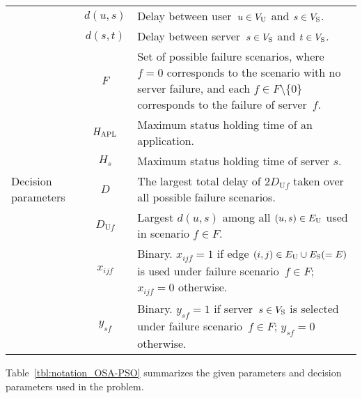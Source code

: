 \documentclass[conference]{IEEEtran}
\begin{document}
\begin{CJK}{UTF8}{ipxm}
\begin{table}[tb]
\begin{tabular}{p{1.3cm}|cp{5.4cm}}
        & $d(u,s)$ & Delay between user~$u \in V_{\rm{U}}$ and $s \in V_{\rm{S}}$. \\
        & $d(s,t)$ & Delay between server~$s \in V_{\rm{S}}$ and $t \in V_{\rm{S}}$. \\ 
        & $F$ & Set of possible failure scenarios, where $f = 0$ corresponds to the scenario with no server failure, and each $f \in F \setminus \{0\}$ corresponds to the failure of server~$f$. \\
        & $H_{\rm APL}$ & Maximum status holding time of an application. \\
        & $H_s$ & Maximum status holding time of server $s$. \\ \hline
        Decision parameters & $D$ & The largest total delay of $2D_{\mathrm{U}f}$ taken over all possible failure scenarios. \\
        & $D_{\mathrm{U}f}$ & Largest $d(u,s)$ among all $(u,s) \in E_{\rm{U}}$ used in scenario $f \in F$. \\
        & $x_{ijf}$ & Binary. $x_{ijf} = 1$ if edge $(i,j) \in E_{\rm U} \cup E_{\rm S} (=E)$ is used under failure scenario~$f \in F$; $x_{ijf} = 0$ otherwise. \\
        & $y_{sf}$ & Binary. $y_{sf} = 1$ if server~$s \in V_{\rm{S}}$ is selected under failure scenario~$f \in F$; $y_{sf} = 0$ otherwise. \\ \hline
    \end{tabular}
\end{table}
Table~\ref{tbl:notation_OSA-PSO} summarizes the given parameters and decision parameters used in the problem.


\end{CJK}
\end{document}

